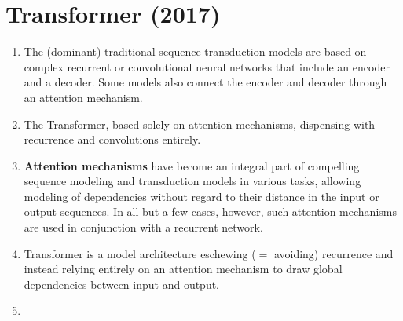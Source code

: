 \chapter{Transformer (2017)}

\begin{tcolorbox}
\end{tcolorbox}



\begin{enumerate}
    \item The (dominant) traditional sequence transduction models are based on complex recurrent or convolutional neural networks that include an encoder and a decoder.
    Some models also connect the encoder and decoder through an attention mechanism.
    \hfill \cite{arxiv/1706.03762/Attention-Is-All-You-Need}

    \item The Transformer, based solely on attention mechanisms, dispensing with recurrence and convolutions entirely. 
    \hfill \cite{arxiv/1706.03762/Attention-Is-All-You-Need}

    \item \textbf{Attention mechanisms} have become an integral part of compelling sequence modeling and transduction models in various tasks, allowing modeling of dependencies without regard to their distance in the input or output sequences.
    In all but a few cases, however, such attention mechanisms are used in conjunction with a recurrent network.
    \hfill \cite{arxiv/1706.03762/Attention-Is-All-You-Need}

    \item Transformer is a model architecture eschewing ($=$ avoiding) recurrence and instead relying entirely on an attention mechanism to draw global dependencies between input and output.
    \hfill \cite{arxiv/1706.03762/Attention-Is-All-You-Need}

    \item 
\end{enumerate}




